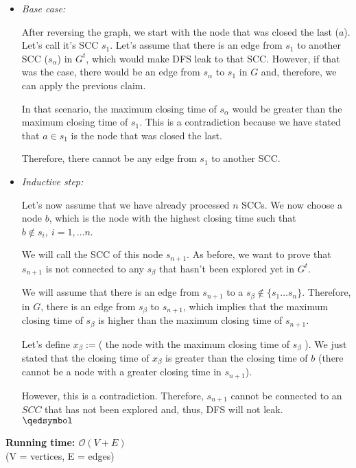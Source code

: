 \begin{itemize}
	\item \textit{Base case:}

After reversing the graph, we start with the node that was closed the last ($a$). Let's call
it's SCC $s_1$. Let's assume that there is an edge from $s_1$ to another SCC ($s_\alpha$) in
$G^t$, which would make DFS leak to that SCC. However, if that was the case, there
would be an edge from $s_\alpha$ to $s_1$ in $G$ and, therefore, we can apply the 
previous claim. 

In that scenario, the maximum closing time of  $s_\alpha$ would be greater than the maximum
closing time of $s_1$. This is a contradiction because we have stated that $a\in s_1$ 
is the node that was closed the last.

Therefore, there cannot be any edge from $s_1$ to another SCC.

\item \textit{Inductive step:}

	Let's now assume that we have already processed $n$ SCCs. We now choose a node $b$,
	which is the node with the highest closing time such that $b \not \in s_i, \
	i=1,\dots n$. 
	
	We will call the SCC of this node $s_{n+1}$.
	As before, we want to prove that $s_{n+1}$ is not 
	connected to any $s_\beta$ that hasn't been explored yet in $G^t$.

	We will assume that there is an edge from $s_{n+1}$ to a $s_{\beta}\not \in 
	\{s_1\dots s_n\}$. Therefore, in $G$, there is an edge from $s_{\beta}$ to
	$s_{n+1}$, which implies that the maximum closing time of $s_{\beta}$ is higher than
	the maximum closing time of $s_{n+1}$. 

	Let's define $x_\beta:=$( the node with the maximum closing time of $s_\beta$ ). 
	We just stated that the closing time of $x_\beta$ is greater than the closing time 
	of $b$ (there cannot be a node with a greater closing time in $s_{n+1}$).

	However, this is a contradiction. Therefore, $s_{n+1}$ cannot
	be connected to an $SCC$ that has not been explored and, thus, DFS will not leak.
	\\ \null \hfill $\qedsymbol$
\end{itemize}

\newpage
{}
\noindent \textbf{\boldmath Running time: $\mathcal{O}(V+E)$}
\\ {\small (V = vertices, E = edges)}


